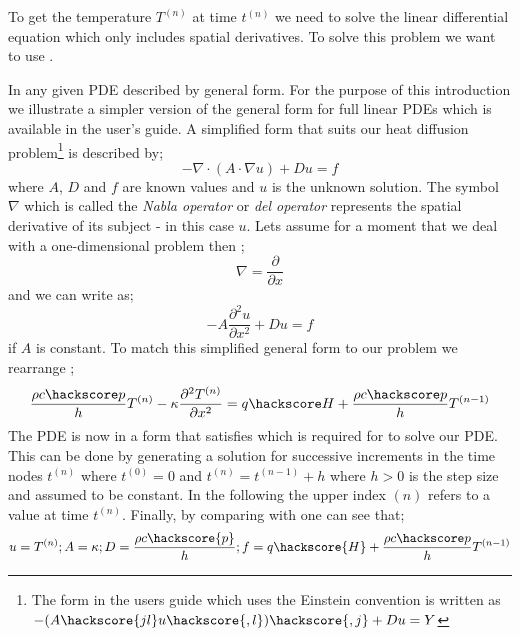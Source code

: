 To get the temperature $T^{(n)}$ at time $t^{(n)}$ we need to solve the linear 
differential equation  which only includes spatial derivatives. To solve this problem
we want to use \esc. 

In \esc any given PDE described by general form. For the purpose of this introduction we illustrate a simpler version of the general form for full linear PDEs which is available in the \esc user's guide. A simplified form that suits our heat diffusion problem\footnote{The form in the \esc users guide which uses the Einstein convention is written as 
$-(A\hackscore{jl} u\hackscore{,l})\hackscore{,j}+D u =Y$}
is described by;
\begin{equation}\label{eqn:commonform nabla}
-\nabla\cdot(A\cdot\nabla u) + Du = f
\end{equation}
where $A$, $D$ and $f$ are known values and $u$ is the unknown solution. The symbol $\nabla$ which is called the \textit{Nabla operator} or \textit{del operator} represents
the spatial derivative of its subject - in this case $u$. Lets assume for a moment that we deal with a one-dimensional problem then ;
\begin{equation}
\nabla = \frac{\partial}{\partial x}
\end{equation}
and we can write  as;
\begin{equation}\label{eqn:commonform}
-A\frac{\partial^{2}u}{\partial x^{2}} + Du = f
\end{equation}
if $A$ is constant. To match this simplified general form to our problem  
we rearrange ;
\begin{equation}
\frac{\rho c\hackscore p}{h} T^{(n)} - \kappa \frac{\partial^2 T^{(n)}}{\partial x^2} = q\hackscore H +  \frac{\rho c\hackscore p}{h} T^{(n-1)}
\label{eqn:hdgenf}
\end{equation}
The PDE is now in a form that satisfies  which is required for \esc to solve our PDE. This can be done by generating a solution for successive increments in the time nodes $t^{(n)}$ where 
$t^{(0)}=0$ and  $t^{(n)}=t^{(n-1)}+h$ where $h>0$ is the step size and assumed to be constant. 
In the following the upper index ${(n)}$ refers to a value at time $t^{(n)}$. Finally, by comparing  with  one can see that;
\begin{equation}\label{ESCRIPT SET}
u=T^{(n)}; 
A = \kappa; D = \frac{\rho c \hackscore{p}}{h}; f = q \hackscore{H} + \frac{\rho c\hackscore p}{h} T^{(n-1)}
\end{equation}

